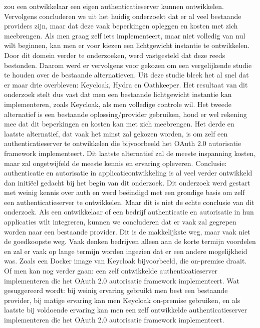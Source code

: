 zou een ontwikkelaar een eigen authenticatieserver kunnen ontwikkelen. Vervolgens concluderen we uit het huidig onderzoekt dat er al veel bestaande 
providers zijn, maar dat deze vaak beperkingen opleggen en kosten met zich meebrengen. Als men graag zelf iets implementeert, maar niet volledig
van nul wilt beginnen, kan men er voor kiezen een lichtgewicht instantie te ontwikkelen. Door dit domein verder te onderzoeken, werd vastgesteld 
dat deze reeds bestonden. Daarom werd er vervolgens voor gekozen om een vergelijkende studie te houden over de bestaande alternatieven. Uit deze
studie bleek het al snel dat er maar drie overbleven: Keycloak, Hydra en Oathkeeper. Het resultaat van dit onderzoek stelt dus vast dat men een bestaande
lichtgewicht instantie kan implementeren, zoals Keycloak, als men volledige controle wil. Het tweede alternatief is een bestaande oplossing/provider
gebruiken, houd er wel rekening mee dat dit beperkingen en kosten kan met zich meebrengen. Het derde en laatste alternatief, dat vaak het minst zal
gekozen worden, is om zelf een authenticatieserver te ontwikkelen die bijvoorbeeld het OAuth 2.0 autorisatie framework implementeert. Dit laatste alternatief
zal de meeste inspanning kosten, maar zal ongetwijfeld de meeste kennis en ervaring opleveren.
\newline
\newline
Conclusie: authenticatie en autorisatie in applicatieontwikkeling is al veel verder ontwikkeld dan initiëel gedacht bij het begin van dit onderzoek.
Dit onderzoek werd gestart met weinig kennis over auth en werd beëindigd met een grondige basis om zelf een authenticatieserver te ontwikkelen.
Maar dit is niet de echte conclusie van dit onderzoek. Als een ontwikkelaar of een bedrijf authenticatie en autorisatie in hun applicaties wilt
integreren, kunnen we concluderen dat er vaak zal gegrepen worden naar een bestaande provider. Dit is de makkelijkste weg, maar vaak niet de
goedkoopste weg. Vaak denken bedrijven alleen aan de korte termijn voordelen en zal er vaak op lange termijn worden ingezien dat er een andere
mogelijkheid was. Zoals een Docker image van Keycloak bijvoorbeeld, die on-premise draait. Of men kan nog verder gaan: een zelf ontwikkelde
authenticatieserver implementeren die het OAuth 2.0 autorisatie framework implementeert. Wat gesuggereerd wordt: bij weinig ervaring gebruikt men
best een bestaande provider, bij matige ervaring kan men Keycloak on-premise gebruiken, en als laatste bij voldoende ervaring kan men een zelf
ontwikkelde authenticatieserver implementeren die het OAuth 2.0 autorisatie framework implementeert.
